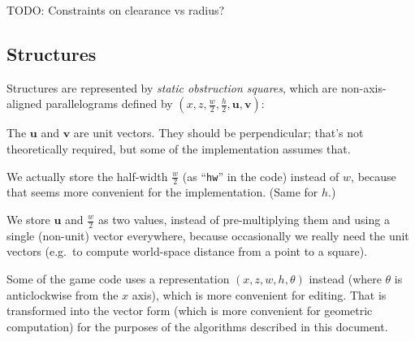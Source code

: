 \documentclass[a4paper,10pt]{article}
\begin{document}
TODO: Constraints on clearance vs radius?

\subsection{Structures}

Structures are represented by \emph{static obstruction squares},
which are non-axis-aligned parallelograms
defined by $(x, z, \frac{w}{2}, \frac{h}{2}, \mathbf{u}, \mathbf{v})$:


The $\mathbf{u}$ and $\mathbf{v}$ are unit vectors.
They should be perpendicular; that's not theoretically required,
but some of the implementation assumes that.

We actually store the half-width $\frac{w}{2}$ (as ``\texttt{hw}'' in the code)
instead of $w$, because that seems more convenient for the implementation.
(Same for $h$.)

We store $\mathbf{u}$ and $\frac{w}{2}$ as two values,
instead of pre-multiplying them and using a single (non-unit) vector everywhere,
because occasionally we really need the unit vectors (e.g.\ to compute
world-space distance from a point to a square).

Some of the game code uses a representation $(x, z, w, h, \theta)$ instead
(where $\theta$ is anticlockwise from the $x$ axis),
which is more convenient for editing.
That is transformed into the vector form
(which is more convenient for geometric computation)
for the purposes of the algorithms described in this document.
\end{document}
